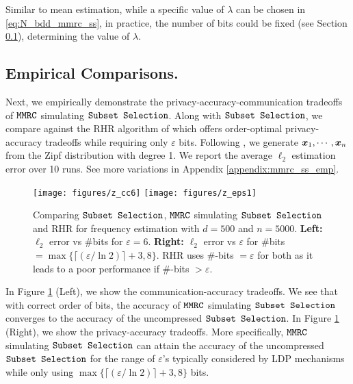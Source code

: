 Similar to mean estimation, while a specific value of $\lambda$ can be chosen in \eqref{eq:N_bdd_mmrc_ss}, in practice, the number of bits could be fixed (see Section \ref{subsec:mmrc_ss_empirical}), determining the value of $\lambda$.

\subsection{Empirical Comparisons.}
\label{subsec:mmrc_ss_empirical}
Next, we empirically demonstrate the privacy-accuracy-communication tradeoffs of $\texttt{MMRC}$ simulating $\texttt{Subset Selection}$. Along with $\texttt{Subset Selection}$, we compare against the RHR algorithm of \cite{CKO20} which offers order-optimal privacy-accuracy tradeoffs while requiring only $\varepsilon$ bits. Following \cite{acharya2019hadamard}, we generate ${\boldsymbol{x}}_1, \cdots, {\boldsymbol{x}}_n$ from the Zipf distribution with degree 1. We report the average $\ell_2$ estimation error over 10 runs. See more variations in 
Appendix \ref{appendix:mmrc_ss_emp}.

\begin{figure}[h]
\centering
\texttt{[image: figures/z\_cc6]} \qquad
\texttt{[image: figures/z\_eps1]}
\caption{Comparing $\texttt{Subset Selection}$, $\texttt{MMRC}$ simulating $\texttt{Subset Selection}$ and RHR for frequency estimation with $d = 500$ and $n = 5000$. \textbf{Left:} $\ell_2$ error vs $\#$bits for $\varepsilon = 6$. \textbf{Right:} $\ell_2$ error vs $\varepsilon$ for $\#$bits $= \max\{\lceil( \varepsilon/ \ln 2)\rceil + 3, 8\}$. RHR uses $\#$-bits $= \varepsilon$ for both as it leads to a poor performance if $\#$-bits $ > \varepsilon$.}
\label{fig:freq}
\end{figure}

In Figure \ref{fig:freq} (Left), we show the communication-accuracy tradeoffs. We see that with correct order of bits, the accuracy of $\texttt{MMRC}$ simulating $\texttt{Subset Selection}$ converges to the accuracy of the uncompressed $\texttt{Subset Selection}$. In Figure \ref{fig:freq} (Right), we show the privacy-accuracy tradeoffs. More specifically, $\texttt{MMRC}$ simulating $\texttt{Subset Selection}$ can attain the accuracy of the uncompressed $\texttt{Subset Selection}$ for the range of  $\varepsilon$'s typically considered by LDP mechanisms while only using $\max\{\lceil( \varepsilon/ \ln 2)\rceil + 3, 8\}$ bits. 